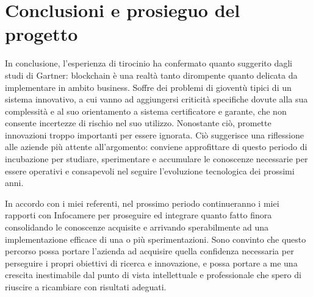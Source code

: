 \section{Conclusioni e prosieguo del progetto}
	In conclusione, l'esperienza di tirocinio ha confermato quanto suggerito dagli studi di Gartner: blockchain è una realtà tanto dirompente quanto delicata da implementare in ambito business. Soffre dei problemi di gioventù tipici di un sistema innovativo, a cui vanno ad aggiungersi criticità specifiche dovute alla sua complessità e al suo orientamento a sistema certificatore e garante, che non consente incertezze di rischio nel suo utilizzo. Nonostante ciò, promette innovazioni troppo importanti per essere ignorata. Ciò suggerisce una riflessione alle aziende più attente all'argomento: conviene approfittare di questo periodo di incubazione per studiare, sperimentare e accumulare le conoscenze necessarie per essere operativi e consapevoli nel seguire l'evoluzione tecnologica dei prossimi anni. 
	
	In accordo con i miei referenti, nel prossimo periodo continueranno i miei rapporti con Infocamere per proseguire ed integrare quanto fatto finora consolidando le conoscenze acquisite e arrivando sperabilmente ad una implementazione efficace di una o più sperimentazioni. Sono convinto che questo percorso possa portare l'azienda ad acquisire quella confidenza necessaria per perseguire i propri obiettivi di ricerca e innovazione, e possa portare a me una crescita inestimabile dal punto di vista intellettuale e professionale che spero di riuscire a ricambiare con risultati adeguati.
	
	
	
	
	
	
	
	
	
	
	
	
	
	
	
	
	
	
	
	
	
	